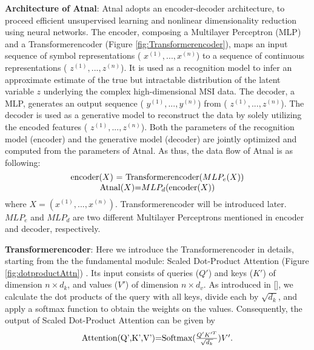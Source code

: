 \documentclass[journal=jacsat,manuscript=article]{achemso}
\begin{document}
\textbf{Architecture of Atnal}: Atnal adopts an encoder-decoder architecture, 
to proceed efficient unsupervised learning and nonlinear 
dimensionality reduction using neural networks.  
The encoder, composing a Multilayer Perceptron (MLP) and a Transformerencoder \cite{vaswani2017attention}
(Figure \ref{fig:Transformerencoder}), 
maps an input sequence of symbol representations ( $x^{(1)}, ..., x^{(n)}$) 
to a sequence of continuous representations ( $z^{(1)}, ..., z^{(n)}$). 
It is used as a recognition model to 
infer an approximate estimate of the true but intractable distribution of the latent 
variable $z$ underlying the complex high-dimensional MSI data.
The decoder, a MLP, generates an output sequence ( $y^{(1)}, ..., y^{(n)}$) 
from ( $z^{(1)}, ..., z^{(n)}$). 
The decoder is used as a generative model to reconstruct the data by solely 
utilizing the encoded features ( $z^{(1)}, ..., z^{(n)}$). Both the parameters 
of the recognition model (encoder) and the generative model (decoder)
are jointly optimized and computed from the parameters of Atnal. As thus, the data flow of 
Atnal is as following:
\begin{equation}
  \begin{minipage}[c]{0.80\linewidth}
    \centering
    encoder($X$) = Transformerencoder($MLP_e$($X$)) \\
    Atnal($X$)=$MLP_d$(encoder($X$)) \\
  \end{minipage}
  \label{eqn:Atnal}
\end{equation}
where $X=( x^{(1)}, ..., x^{(n)})$. Transformerencoder will be introduced later. $MLP_e$ and $MLP_d$ are two different 
Multilayer Perceptrons mentioned in encoder and decoder, respectively.


\textbf{Transformerencoder}: Here we introduce the Transformerencoder in details, starting from the 
the fundamental module: Scaled Dot-Product Attention (Figure \ref{fig:dotproductAttn}) \cite{vaswani2017attention}.  
Its input consists of queries ($Q'$) and keys ($K'$) 
 of dimension $n \times d_k$, and values ($V'$) of  dimension $n \times d_{v}$. 
As introduced in [], we calculate the dot products of the
query with all keys, divide each by $\sqrt{d_{k}}$, and apply a softmax function to obtain the weights on the values. 
Consequently, the output of Scaled Dot-Product Attention can be given by
\begin{equation}
  \begin{minipage}[c]{0.80\linewidth}
    \centering
    Attention(Q',K',V')=Softmax($\frac{Q'K'^T}{\sqrt{d_{k}}}$)$V'$.
  \end{minipage}
  \label{eqn:Attention}
\end{equation}
\end{document}
